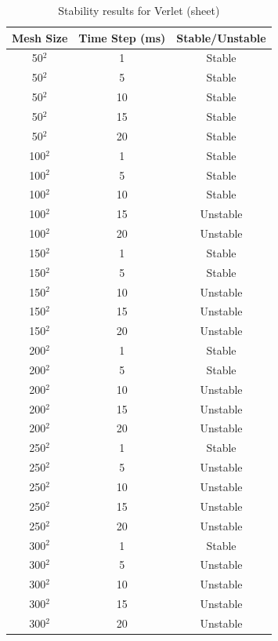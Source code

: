 \begin{table}[tp]
   \begin{minipage}{\textwidth}
      \begin{center}
         \begin{tabular}{|c|c|c|} \hline
           Mesh Size & Time Step (ms) & Stable/Unstable\\
           \hline
           50$^{2}$ & 1 & Stable\\ \hline
           50$^{2}$ & 5 & Stable\\ \hline
           50$^{2}$ & 10 & Stable\\ \hline
           50$^{2}$ & 15 & Stable\\ \hline
           50$^{2}$ & 20 & Stable\\ \hline
           100$^{2}$ & 1 & Stable\\ \hline
           100$^{2}$ & 5 & Stable\\ \hline
           100$^{2}$ & 10 & Stable\\ \hline
           100$^{2}$ & 15 & Unstable\\ \hline
           100$^{2}$ & 20 & Unstable\\ \hline           
           150$^{2}$ & 1 & Stable\\ \hline
           150$^{2}$ & 5 & Stable\\ \hline
           150$^{2}$ & 10 & Unstable\\ \hline
           150$^{2}$ & 15 & Unstable\\ \hline
           150$^{2}$ & 20 & Unstable\\ \hline           
           200$^{2}$ & 1 & Stable\\ \hline
           200$^{2}$ & 5 & Stable\\ \hline
           200$^{2}$ & 10 & Unstable\\ \hline
           200$^{2}$ & 15 & Unstable\\ \hline
           200$^{2}$ & 20 & Unstable\\ \hline           
           250$^{2}$ & 1 & Stable\\ \hline
           250$^{2}$ & 5 & Unstable\\ \hline
           250$^{2}$ & 10 & Unstable\\ \hline
           250$^{2}$ & 15 & Unstable\\ \hline
           250$^{2}$ & 20 & Unstable\\ \hline           
           300$^{2}$ & 1 & Stable\\ \hline
           300$^{2}$ & 5 & Unstable\\ \hline
           300$^{2}$ & 10 & Unstable\\ \hline
           300$^{2}$ & 15 & Unstable\\ \hline
           300$^{2}$ & 20 & Unstable\\ \hline
         \end{tabular}
      \end{center}
   \end{minipage}
   \caption{Stability results for Verlet (sheet)}
   \label{tab:v stability sheet}
\end{table}

